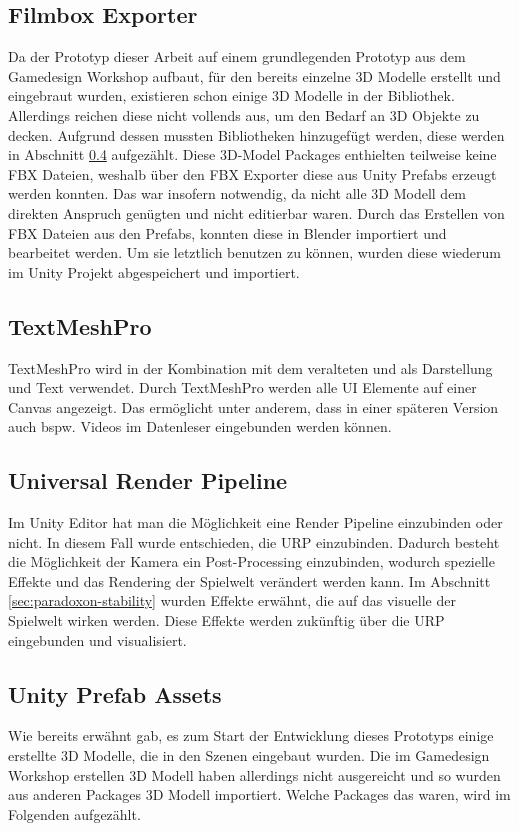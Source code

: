 \subsection{Filmbox Exporter}
Da der Prototyp dieser Arbeit auf einem grundlegenden Prototyp aus dem Gamedesign Workshop aufbaut, für den bereits einzelne \ac{3D} Modelle erstellt und eingebraut wurden, existieren schon einige \ac{3D} Modelle in der Bibliothek. Allerdings reichen diese nicht vollends aus, um den Bedarf an \ac{3D} Objekte zu decken. Aufgrund dessen mussten Bibliotheken hinzugefügt werden, diese werden in Abschnitt \ref{sec:extra-assets}  aufgezählt. Diese \ac{3D}-Model Packages enthielten teilweise keine \ac{FBX} Dateien, weshalb über den \ac{FBX} Exporter diese aus Unity Prefabs erzeugt werden konnten. Das war insofern notwendig, da nicht alle \ac{3D} Modell dem direkten Anspruch genügten und nicht editierbar waren. Durch das Erstellen von \ac{FBX} Dateien aus den Prefabs, konnten diese in Blender importiert und bearbeitet werden. Um sie letztlich benutzen zu können, wurden diese wiederum im Unity Projekt abgespeichert und importiert.

\subsection{TextMeshPro}
TextMeshPro wird in der Kombination mit dem veralteten  und  als Darstellung und Text verwendet. Durch TextMeshPro werden alle \ac{UI} Elemente auf einer Canvas angezeigt. Das ermöglicht unter anderem, dass in einer späteren Version auch bspw. Videos im Datenleser eingebunden werden können.

\subsection{Universal Render Pipeline}
Im Unity Editor hat man die Möglichkeit eine Render Pipeline einzubinden oder nicht. In diesem Fall wurde entschieden, die \ac{URP} einzubinden. Dadurch besteht die Möglichkeit der Kamera ein Post-Processing einzubinden, wodurch spezielle Effekte und das Rendering der Spielwelt verändert werden kann. Im Abschnitt \ref{sec:paradoxon-stability}  wurden Effekte erwähnt, die auf das visuelle der Spielwelt wirken werden. Diese Effekte werden zukünftig über die \ac{URP} eingebunden und visualisiert.

\subsection{Unity Prefab Assets}\label{sec:extra-assets}
Wie bereits erwähnt gab, es zum Start der Entwicklung dieses Prototyps einige erstellte \ac{3D} Modelle, die in den Szenen eingebaut wurden. Die im Gamedesign Workshop erstellen \ac{3D} Modell haben allerdings nicht ausgereicht und so wurden aus anderen Packages \ac{3D} Modell importiert. Welche Packages das waren, wird im Folgenden aufgezählt.


